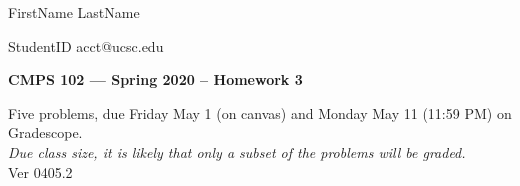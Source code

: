 \documentclass[11pt]{article}
\theoremstyle{definition}
\begin{document}
\hfill FirstName  LastName  

\hfill StudentID  acct@ucsc.edu

\begin{center}
{\bf\Large 
CMPS 102 --- Spring 2020 --  Homework 3 %
}
\end{center}

\begin{center}
Five problems, due Friday May 1 (on canvas) and Monday May 11 (11:59 PM) on Gradescope.  \\
\textit{Due class size, it is likely that only a subset of the problems will be graded.} \\
Ver 0405.2
\end{center}



\medskip

\renewcommand{\P}{\mbox{IH}}
\end{document}
